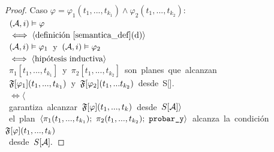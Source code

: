 \begin{proof}
\noindent Caso $\varphi = \varphi_1(t_1,...,t_{k_1}) \land \varphi_2(t_1,...,t_{k_2}) $:\\
\mbox{\hspace{10mm} $(\mathcal{A}, i) \vDash \varphi$}\\
\mbox{\hspace{5mm} $\iff \langle \text{definición \ref{semantica_def}(d)} \rangle$}\\
\mbox{\hspace{10mm} $(\mathcal{A}, i) \vDash \varphi_1$ y $(\mathcal{A}, i) \vDash \varphi_2$}\\
\mbox{\hspace{5mm} $\iff \langle \text{hipótesis inductiva} \rangle$}\\
\mbox{\hspace{10mm} $\pi_1[t_1,...,t_{k_1}]$ y $\pi_2[t_1,...,t_{k_2}]$ son planes que
alcanzan}\\
\mbox{\hspace{10mm} $\mathfrak{F}[\varphi_1](t_1,...,t_{k_1})$ y $\mathfrak{F}[\varphi_2](t_1,...t_{k_2})$
desde S[\A].}\\
\mbox{\hspace{5mm} $\iff \langle$ }\\
\mbox{\hspace{20mm} garantiza alcanzar $\mathfrak{F}[\varphi](t_1,...,t_k)$ desde
$S[\mathcal{A}] \rangle$}\\
\mbox{\hspace{5mm} el plan
$\tup{\pi_1(t_1,...,t_{k_1});\ \pi_2(t_1,...,t_{k_2});\ \texttt{probar\_y}}$ alcanza la condición
$\mathfrak{F}[\varphi](t_1,...,t_k)$}\\
\mbox{\hspace{5mm} desde $S[\mathcal{A}].$}


\end{proof}
